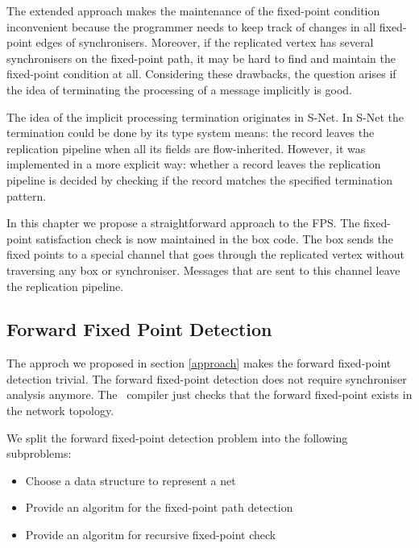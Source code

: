 The extended approach makes the maintenance of the fixed-point condition inconvenient because the programmer needs to keep track of changes in all fixed-point edges of synchronisers. Moreover, if the replicated vertex has several synchronisers on the fixed-point path, it may be hard to find and maintain the fixed-point condition at all. Considering these drawbacks, the question arises if the idea of terminating the processing of a message implicitly is good.


The idea of the implicit processing termination originates in S-Net. In S-Net the termination could be done by its type system means: the record leaves the replication pipeline when all its fields are flow-inherited. However, it was implemented in a more explicit way: whether a record leaves the replication pipeline is decided by checking if the record matches the specified termination pattern.


In this chapter we propose a straightforward approach to the FPS. The fixed-point satisfaction check is now maintained in the box code. The box sends the fixed points to a special channel that goes through the replicated vertex without traversing any box or synchroniser. Messages that are sent to this channel leave the replication pipeline.




    \subsection{Forward Fixed Point Detection\label{ffp_detect}}
The approch we proposed in section \ref{approach} makes the forward fixed-point detection trivial. The forward fixed-point detection does not require synchroniser analysis anymore. The \ak\ compiler just checks that the forward fixed-point exists in the network topology.

We split the forward fixed-point detection problem into the following subproblems:
\begin{itemize}
\item Choose a data structure to represent a net
\item Provide an algoritm for the fixed-point path detection
\item Provide an algoritm for recursive fixed-point check
\end{itemize}

